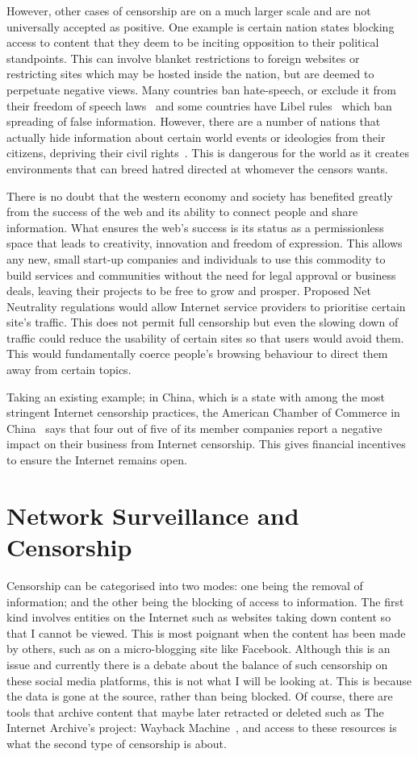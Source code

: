 \documentclass[ %
                    author={Samuel Russell},
                supervisor={Prof. Bogdan Warinschi},
                    degree={MEng},
                     title={Innocuous Ciphertexts},
                  subtitle={The DE-CENSOR Scheme},
                      type={Research},
                      year={2018} ]{dissertation}
\begin{document}
However, other cases of censorship are on a much larger scale and are not universally accepted as positive. One example is certain nation states blocking access to content that they deem to be inciting opposition to their political standpoints. This can involve blanket restrictions to foreign websites or restricting sites which may be hosted inside the nation, but are deemed to perpetuate negative views. Many countries ban hate-speech, or exclude it from their freedom of speech laws~\cite{hate} and some countries have Libel rules~\cite{libel} which ban spreading of false information. However, there are a number of nations that actually hide information about certain world events or ideologies from their citizens, depriving their civil rights~\cite{chincensor}. This is dangerous for the world as it creates environments that can breed hatred directed at whomever the censors wants.

There is no doubt that the western economy and society has benefited greatly from the success of the web and its ability to connect people and share information. What ensures the web's success is its status as a permissionless space that leads to creativity, innovation and freedom of expression. This allows any new, small start-up companies and individuals to use this commodity to build services and communities without the need for legal approval or business deals, leaving their projects to be free to grow and prosper. Proposed Net Neutrality regulations would allow Internet service providers to prioritise certain site's traffic. This does not permit full censorship but even the slowing down of traffic could reduce the usability of certain sites so that users would avoid them. This would fundamentally coerce people's browsing behaviour to direct them away from certain topics.

Taking an existing example; in China, which is a state with among the most stringent Internet censorship practices, the American Chamber of Commerce in China~\cite{amcham} says that four out of five of its member companies report a negative impact on their business from Internet censorship. This gives financial incentives to ensure the Internet remains open.

\section{Network Surveillance and Censorship}

Censorship can be categorised into two modes: one being the removal of information; and the other being the blocking of access to information. The first kind involves entities on the Internet such as websites taking down content so that I cannot be viewed. This is most poignant when the content has been made by others, such as on a micro-blogging site like Facebook. Although this is an issue and currently there is a debate about the balance of such censorship on these social media platforms, this is not what I will be looking at. This is because the data is gone at the source, rather than being blocked. Of course, there are tools that archive content that maybe later retracted or deleted such as The Internet Archive's project: Wayback Machine~\cite{wb}, and access to these resources is what the second type of censorship is about.
\end{document}
